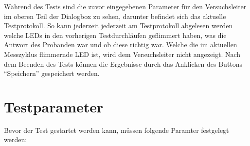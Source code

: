 \documentclass[11pt,accentcolor=tud2a,colorback,noheadingspace,bigchapter]{tudreport}
\begin{document}
Während des Tests sind die zuvor eingegebenen Parameter für den Versuchsleiter 
im oberen Teil der Dialogbox zu sehen, darunter befindet sich das aktuelle 
Testprotokoll. So kann jederzeit jederzeit am Testprotokoll abgelesen werden 
welche LEDs in den vorherigen Testdurchläufen geflimmert haben, was die Antwort 
des Probanden war und ob diese richtig war. Welche die im aktuellen Messzyklus 
flimmernde LED ist, wird dem Versuchsleiter nicht angezeigt. Nach dem Beenden 
des Tests können die Ergebnisse durch das Anklicken des Buttons ``Speichern'' 
gespeichert werden.


\section{Testparameter}
\label{tests:test-parameter}\label{tests:testparameter}
Bevor der Test gestartet werden kann, müssen folgende Paramter festgelegt werden:
\end{document}
